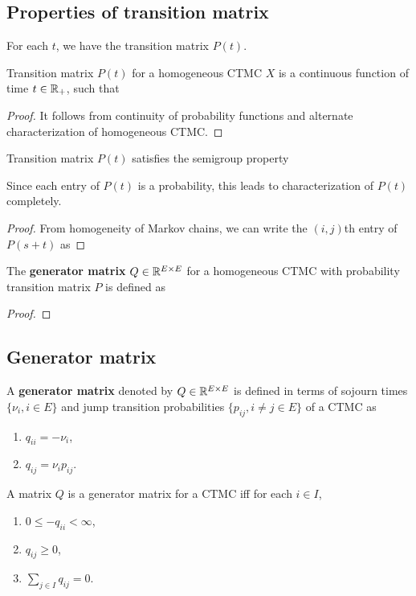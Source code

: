 \documentclass[a4paper,10pt,english]{article}
\begin{document}
\subsection{Properties of transition matrix}
For each $t$, we have the transition matrix $P(t)$.
\begin{lem}[continuity]
Transition matrix $P(t)$ for a homogeneous CTMC $X$ is a continuous function of time $t \in \mathbb{R}_+$, such that
\end{lem}
\begin{proof}
It follows from continuity of probability functions and alternate characterization of homogeneous CTMC.
\end{proof}
\begin{lem}
Transition matrix $P(t)$ satisfies the semigroup property
\end{lem}
Since each entry of $P(t)$ is a probability, this leads to characterization of $P(t)$ completely. 
\begin{proof}
From homogeneity of Markov chains, we can write the $(i,j)$th entry of $P(s+t)$ as
\end{proof}
\begin{thm} 
The \textbf{generator matrix} $Q \in \mathbb{R}^{E \times E}$ for a homogeneous CTMC with probability transition matrix $P$ is defined as 
\end{thm}
\begin{proof}

\end{proof}
\subsection{Generator matrix}
A \textbf{generator matrix} denoted by $Q \in \mathbb{R}^{E \times E}$ is defined in terms of sojourn times $\{\nu_i, i \in E\}$ and jump transition probabilities $\{p_{ij}, i \neq j \in E\}$ of a CTMC as
\begin{enumerate}[i\_]
\item $q_{ii}= -\nu_i$,
\item $q_{ij}=\nu_i p_{ij}$. 
\end{enumerate}

\begin{lem} A matrix $Q$ is a generator matrix for a CTMC iff for each $i \in I$,
 \begin{enumerate}
\item $0 \leq -q_{ii} < \infty$, 
\item $q_{ij} \geq 0$,
\item $\sum_{j \in I}q_{ij}=0$.
\end{enumerate}
\end{lem}
\end{document}
